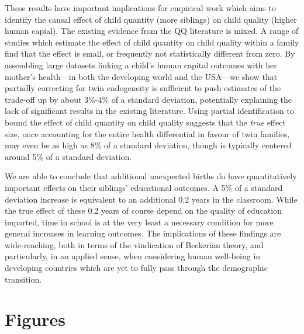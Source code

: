 These results have important implications for empirical work which aims to 
identify the causal effect of child quantity (more siblings) on child quality
(higher human capial).  The existing evidence from the QQ literature is 
mixed.  A range of studies which estimate the effect of child quantity on child 
quality within a family find that the effect is small, or frequently not 
statistically different from zero.  By assembling large datasets linking a 
child's human capital outcomes with her mother's health---in both the developing 
world and the USA---we show that partially correcting for twin endogeneity is 
sufficient to push estimates of the trade-off up by about 3\%-4\% of a standard 
deviation, potentially explaining the lack of significant results in the 
existing literature.  Using partial identification to bound the effect of child 
quantity on child quality suggests that the \emph{true} effect size, once 
accounting for the entire health differential in favour of twin families, may 
even be as high as 8\% of a standard deviation, though is typically centered
around 5\% of a standard deviation.

We are able to conclude that additional unexpected births do have
quantitatively important effects on their siblings' educational outcomes.  
A 5\% of a standard deviation increase is equivalent to an additional 0.2
years in the classroom.  While the true effect of these 0.2 years of course
depend on the quality of education imparted, time in school is at the very 
least a necessary condition for more general increases in learning outcomes.  
The implications of these findings are wide-reaching, both in terms of the 
vindication of Beckerian theory, and particularly, in an applied sense, when 
considering human well-being in developing countries which are yet to fully 
pass through the demographic transition.



\newpage
\section*{Figures}


